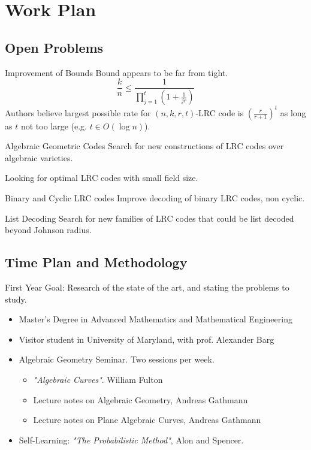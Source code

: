 \section{Work Plan}
\subsection{Open Problems}

\begin{frame}{Improvement of Bounds}
Bound appears to be far from tight.
$$ \frac{k}{n} \leq \frac{1}{\prod_{j=1}^{t} (1 + \frac{1}{jr} )} $$
Authors believe largest possible rate for $(n,k,r,t)$-LRC code is $\left(\frac{r}{r+1}\right)^t$ as long as $t$ not too large (e.g. $t\in O(\log n)$).
\end{frame}

\begin{frame}{Algebraic Geometric Codes}
Search for new constructions of LRC codes over algebraic varieties.

Looking for optimal LRC codes with small field size.
\end{frame}

\begin{frame}{Binary and Cyclic LRC codes}
Improve decoding of binary LRC codes, non cyclic.
\end{frame}

\begin{frame}{List Decoding}
Search for new families of LRC codes that could be list decoded beyond Johnson radius.
\end{frame}

\subsection{Time Plan and Methodology}
\begin{frame}{First Year}
Goal: Research of the state of the art, and stating the problems to study.
\begin{itemize}
\item Master's Degree in Advanced Mathematics and Mathematical Engineering
\item Visitor student in University of Maryland, with prof. Alexander Barg
\item Algebraic Geometry Seminar. Two sessions per week.
\begin{itemize}
\item \textit{"Algebraic Curves"}. William Fulton
\item Lecture notes on Algebraic Geometry, Andreas Gathmann
\item Lecture notes on Plane Algebraic Curves, Andreas Gathmann
\end{itemize}
\item Self-Learning: \textit{"The Probabilistic Method"}, Alon and Spencer.
\end{itemize}
\end{frame}

